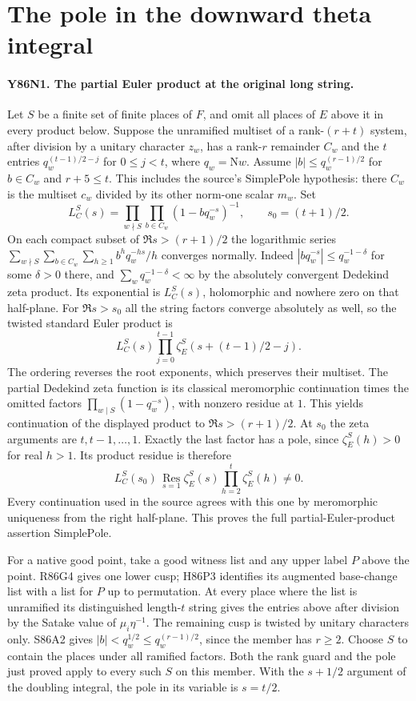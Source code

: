 \section{The pole in the downward theta integral}

\paragraph{Y86N1. The partial Euler product at the original long string.}
Let $S$ be a finite set of finite places of $F$, and omit all places
of $E$ above it in every product below. Suppose the unramified
multiset of a rank-$(r+t)$ system, after division by a unitary
character $z_w$, has a rank-$r$ remainder $C_w$ and the $t$ entries
$q_w^{(t-1)/2-j}$ for $0\le j<t$, where $q_w=\mathrm Nw$.
Assume $|b|\le q_w^{(r-1)/2}$ for $b\in C_w$ and $r+5\le t$.
This includes the source's $\mathrm{SimplePole}$ hypothesis:
there $C_w$ is the multiset $c_w$ divided by its other norm-one
scalar $m_w$. Set
\[
 L_C^S(s)=\prod_{w\nmid S}\prod_{b\in C_w}(1-bq_w^{-s})^{-1},
 \qquad s_0=(t+1)/2 .
\]
On each compact subset of $\Re s>(r+1)/2$ the logarithmic series
$\sum_{w\nmid S}\sum_{b\in C_w}\sum_{h\ge1}b^h q_w^{-hs}/h$ converges
normally. Indeed $|bq_w^{-s}|\le q_w^{-1-\delta}$ for some
$\delta>0$ there, and $\sum_w q_w^{-1-\delta}<\infty$ by the
absolutely convergent Dedekind zeta product. Its exponential is
$L_C^S(s)$, holomorphic and nowhere zero on that half-plane. For
$\Re s>s_0$ all the string factors converge absolutely as well, so
the twisted standard Euler product is
\[
 L_C^S(s)\prod_{j=0}^{t-1}\zeta_E^S(s+(t-1)/2-j).
\]
The ordering reverses the root exponents, which preserves their
multiset. The partial Dedekind zeta function is its classical
meromorphic continuation times the omitted factors
$\prod_{w\mid S}(1-q_w^{-s})$, with nonzero residue at $1$.
This yields continuation of the displayed product to
$\Re s>(r+1)/2$. At $s_0$ the zeta arguments are $t,t-1,\ldots,1$.
Exactly the last factor has a pole, since $\zeta_E^S(h)>0$ for real
$h>1$. Its product residue is therefore
\[
 L_C^S(s_0)\,\operatorname*{Res}_{s=1}\zeta_E^S(s)
        \prod_{h=2}^t\zeta_E^S(h)\ne0 .
\]
Every continuation used in the source agrees with this one by
meromorphic uniqueness from the right half-plane. This proves the
full partial-Euler-product assertion $\mathrm{SimplePole}$.

For a native good point, take a good witness list and any upper
label $P$ above the point. R86G4 gives one lower cusp; H86P3
identifies its augmented base-change list with a list for $P$
up to permutation. At every place where the list is unramified
its distinguished length-$t$ string gives the entries above after
division by the Satake value of $\mu_i\eta^{-1}$. The
remaining cusp is twisted by unitary characters only. S86A2 gives
$|b|<q_w^{1/2}\le q_w^{(r-1)/2}$, since the member has $r\ge2$.
Choose $S$ to contain the places under all ramified factors.
Both the rank guard and the pole just proved apply to every such
$S$ on this member. With the $s+1/2$ argument of the doubling
integral, the pole in its variable is $s=t/2$.

